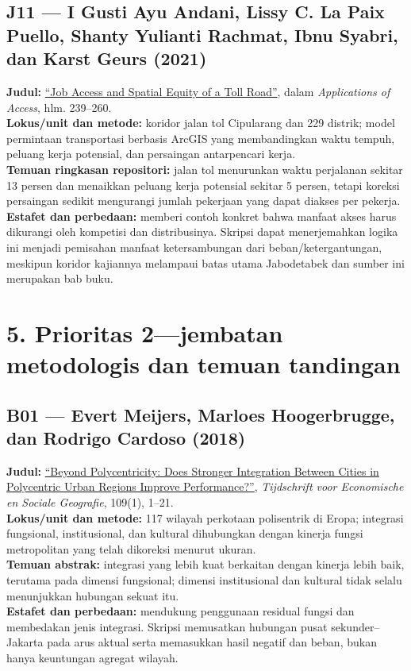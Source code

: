 \documentclass[
  indonesian,
  11pt,
  a4paper,
  oneside,
  openany]{report}
\begin{document}
\subsection{J11 --- I Gusti Ayu Andani, Lissy C. La Paix Puello, Shanty
Yulianti Rachmat, Ibnu Syabri, dan Karst Geurs
(2021)}\label{j11-i-gusti-ayu-andani-lissy-c.-la-paix-puello-shanty-yulianti-rachmat-ibnu-syabri-dan-karst-geurs-2021}

\textbf{Judul:}
\href{https://ses.library.usyd.edu.au/handle/2123/26890}{``Job Access
and Spatial Equity of a Toll Road''}, dalam \emph{Applications of
Access}, hlm. 239--260.\\
\textbf{Lokus/unit dan metode:} koridor jalan tol Cipularang dan 229
distrik; model permintaan transportasi berbasis ArcGIS yang
membandingkan waktu tempuh, peluang kerja potensial, dan persaingan
antarpencari kerja.\\
\textbf{Temuan ringkasan repositori:} jalan tol menurunkan waktu
perjalanan sekitar 13 persen dan menaikkan peluang kerja potensial
sekitar 5 persen, tetapi koreksi persaingan sedikit mengurangi jumlah
pekerjaan yang dapat diakses per pekerja.\\
\textbf{Estafet dan perbedaan:} memberi contoh konkret bahwa manfaat
akses harus dikurangi oleh kompetisi dan distribusinya. Skripsi dapat
menerjemahkan logika ini menjadi pemisahan manfaat ketersambungan dari
beban/ketergantungan, meskipun koridor kajiannya melampaui batas utama
Jabodetabek dan sumber ini merupakan bab buku.

\section{5. Prioritas 2---jembatan metodologis dan temuan
tandingan}\label{prioritas-2jembatan-metodologis-dan-temuan-tandingan}

\subsection{B01 --- Evert Meijers, Marloes Hoogerbrugge, dan Rodrigo
Cardoso
(2018)}\label{b01-evert-meijers-marloes-hoogerbrugge-dan-rodrigo-cardoso-2018}

\textbf{Judul:} \href{https://doi.org/10.1111/tesg.12292}{``Beyond
Polycentricity: Does Stronger Integration Between Cities in Polycentric
Urban Regions Improve Performance?''}, \emph{Tijdschrift voor
Economische en Sociale Geografie}, 109(1), 1--21.\\
\textbf{Lokus/unit dan metode:} 117 wilayah perkotaan polisentrik di
Eropa; integrasi fungsional, institusional, dan kultural dihubungkan
dengan kinerja fungsi metropolitan yang telah dikoreksi menurut
ukuran.\\
\textbf{Temuan abstrak:} integrasi yang lebih kuat berkaitan dengan
kinerja lebih baik, terutama pada dimensi fungsional; dimensi
institusional dan kultural tidak selalu menunjukkan hubungan sekuat
itu.\\
\textbf{Estafet dan perbedaan:} mendukung penggunaan residual fungsi dan
membedakan jenis integrasi. Skripsi memusatkan hubungan pusat
sekunder--Jakarta pada arus aktual serta memasukkan hasil negatif dan
beban, bukan hanya keuntungan agregat wilayah.
\end{document}
